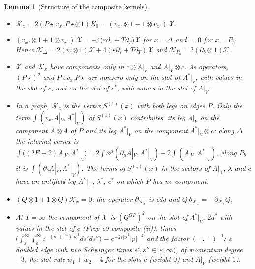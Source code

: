 \documentclass[11pt]{article}
\numberwithin{equation}{section}
\theoremstyle{plain}
\newtheorem{lemma}[theorem]{Lemma}
\theoremstyle{definition}
\newcommand{\Ap}{A|_{\perp}}
\newcommand{\AV}{A|_V}
\begin{document}
\begin{lemma}[Structure of the composite kernels]
\label{lem:cc-kernels}
\begin{itemize}
\item[(i)] $\mathcal K_x=2(P\star\,v_x.\,P\star\otimes1)K_0=(v_x.\otimes1-1\otimes v_x.)\,\mathcal X$.
\item[(ii)] $(v_x.\otimes1+1\otimes v_x.)\,\mathcal X=-4\big(\varepsilon\partial_\varepsilon+T\partial_T\big)\mathcal X$ for $x=\Delta$ and $=0$ for $x=P_b$. Hence $\mathcal K_\Delta=2(v.\otimes1)\mathcal X+4(\varepsilon\partial_\varepsilon+T\partial_T)\mathcal X$ and $\mathcal K_{P_b}=2(\partial_b\otimes1)\mathcal X$.
\item[(iii)] $\mathcal X$ and $\mathcal K_x$ have components only in $c\otimes\AV$ and $\AV\otimes c$. As operators, $(P\star)^2$ and $P\star v_x.P\star$ are nonzero only on the slot of $A^*|_V$, with values in the slot of $c$, and on the slot of $c^*$, with values in the slot of $\AV$.
\item[(iv)] In a graph, $\mathcal K_x$ is the vertex $S^{(1)}(x)$ with both legs on edges $P$. Only the term $\int(v_x.\AV,A^*|_V)$ of $S^{(1)}(x)$ contributes, its leg $\AV$ on the component $A\otimes A$ of $P$ and its leg $A^*|_V$ on the component $A^*|_V\otimes c$: along $\Delta$ the internal vertex is $\int\big((2E+2)\AV,A^*|_V\big)=2\int x^\mu(\partial_\mu\AV,A^*|_V)+2\int(\AV,A^*|_V)$, along $P_b$ it is $\int(\partial_b\AV,A^*|_V)$. The terms of $S^{(1)}(x)$ in the sectors of $\Ap$, $\lambda$ and $c$ have an antifield leg $A^*|_\perp$, $\lambda^*$, $c^*$ on which $P$ has no component.
\item[(v)] $(Q\otimes1+1\otimes Q)\mathcal K_x=0$; the operator $\partial_{\mathcal K_x}$ is odd and $Q\,\partial_{\mathcal K_x}=-\partial_{\mathcal K_x}Q$.
\item[(vi)] At $T=\infty$ the component of $\mathcal X$ is $(Q^{GF})^2$ on the slot of $A^*|_V$, $2d^*$ with values in the slot of $c$ (Prop c9-composite (ii)), times $\big(\int_\varepsilon^\infty\!\!\int_\varepsilon^\infty e^{-(s'+s'')|p|^2}ds'ds''\big)=e^{-2\varepsilon|p|^2}|p|^{-4}$ and the factor $(-,-)^{-1}$: a doubled edge with two Schwinger times $s',s''\in[\varepsilon,\infty)$, of momentum degree $-3$, the slot rule $w_1+w_2-4$ for the slots $c$ (weight $0$) and $\AV$ (weight $1$).
\end{itemize}
\end{lemma}
\end{document}
